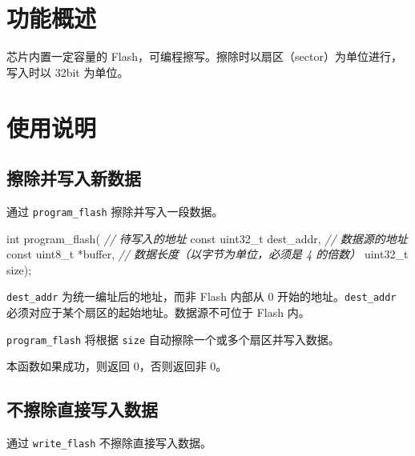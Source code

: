 \documentclass[
  12pt,
]{book}
\newenvironment{Shaded}{\begin{snugshade}}{\end{snugshade}}
\newcommand{\CommentTok}[1]{\textcolor[rgb]{0.56,0.35,0.01}{\textit{#1}}}
\newcommand{\DataTypeTok}[1]{\textcolor[rgb]{0.13,0.29,0.53}{#1}}
\newcommand{\NormalTok}[1]{#1}
\begin{document}
\hypertarget{ux529fux80fdux6982ux8ff0-9}{%
\section{功能概述}\label{ux529fux80fdux6982ux8ff0-9}}

芯片内置一定容量的 Flash，可编程擦写。擦除时以扇区（sector）为单位进行，
写入时以 32bit 为单位。

\hypertarget{ux4f7fux7528ux8bf4ux660e-10}{%
\section{使用说明}\label{ux4f7fux7528ux8bf4ux660e-10}}

\hypertarget{ux64e6ux9664ux5e76ux5199ux5165ux65b0ux6570ux636e}{%
\subsection{擦除并写入新数据}\label{ux64e6ux9664ux5e76ux5199ux5165ux65b0ux6570ux636e}}

通过 \texttt{program\_flash} 擦除并写入一段数据。

\begin{Shaded}
\begin{Highlighting}[]
\DataTypeTok{int}\NormalTok{ program_flash(}
    \CommentTok{// 待写入的地址}
    \DataTypeTok{const} \DataTypeTok{uint32_t}\NormalTok{ dest_addr,}
    \CommentTok{// 数据源的地址}
    \DataTypeTok{const} \DataTypeTok{uint8_t}\NormalTok{ *buffer,}
    \CommentTok{// 数据长度（以字节为单位，必须是 4 的倍数）}
    \DataTypeTok{uint32_t}\NormalTok{ size);}
\end{Highlighting}
\end{Shaded}

\texttt{dest\_addr} 为统一编址后的地址，而非 Flash 内部从 0 开始的地址。\texttt{dest\_addr}
必须对应于某个扇区的起始地址。数据源不可位于 Flash 内。

\texttt{program\_flash} 将根据 \texttt{size} 自动擦除一个或多个扇区并写入数据。

本函数如果成功，则返回 0，否则返回非 0。

\hypertarget{ux4e0dux64e6ux9664ux76f4ux63a5ux5199ux5165ux6570ux636e}{%
\subsection{不擦除直接写入数据}\label{ux4e0dux64e6ux9664ux76f4ux63a5ux5199ux5165ux6570ux636e}}

通过 \texttt{write\_flash} 不擦除直接写入数据。
\end{document}
